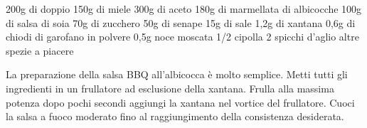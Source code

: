 \label{salsa-bbq}
\serves{-}
\begin{ingreds}
	200g di doppio 
	150g di miele
	300g di aceto
	180g di marmellata di albicocche
	100g di salsa di soia
	70g di zucchero
	50g di senape
	15g di sale
	1,2g di xantana
	0,6g di chiodi di garofano in polvere
	0,5g noce moscata
	1/2 cipolla
	2 spicchi d'aglio
	altre spezie a piacere

\end{ingreds}

\begin{method}
La preparazione della salsa BBQ all'albicocca è molto semplice. Metti tutti gli ingredienti in un frullatore ad esclusione della xantana. Frulla alla massima potenza dopo pochi secondi aggiungi la xantana nel vortice del frullatore.
Cuoci la salsa a fuoco moderato fino al raggiungimento della consistenza desiderata.
\end{method}



